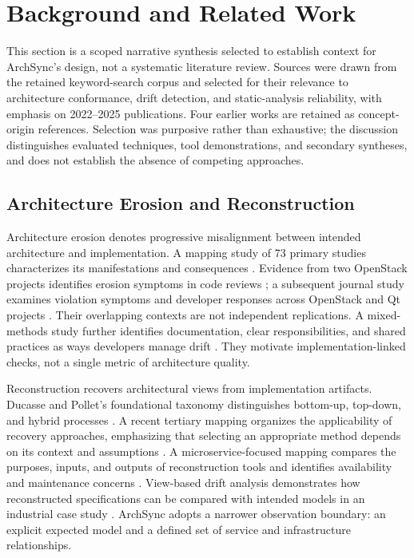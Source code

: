 \section{Background and Related Work}

This section is a scoped narrative synthesis selected to establish context for ArchSync's design, not a systematic literature review. Sources were drawn from the retained keyword-search corpus and selected for their relevance to architecture conformance, drift detection, and static-analysis reliability, with emphasis on 2022--2025 publications. Four earlier works are retained as concept-origin references. Selection was purposive rather than exhaustive; the discussion distinguishes evaluated techniques, tool demonstrations, and secondary syntheses, and does not establish the absence of competing approaches.

\subsection{Architecture Erosion and Reconstruction}

Architecture erosion denotes progressive misalignment between intended architecture and implementation. A mapping study of 73 primary studies characterizes its manifestations and consequences \cite{li2022erosion}. Evidence from two OpenStack projects identifies erosion symptoms in code reviews \cite{li2022symptoms}; a subsequent journal study examines violation symptoms and developer responses across OpenStack and Qt projects \cite{li2023warnings}. Their overlapping contexts are not independent replications. A mixed-methods study further identifies documentation, clear responsibilities, and shared practices as ways developers manage drift \cite{anthony2024drifting}. They motivate implementation-linked checks, not a single metric of architecture quality.

Reconstruction recovers architectural views from implementation artifacts. Ducasse and Pollet's foundational taxonomy distinguishes bottom-up, top-down, and hybrid processes \cite{ducasse2009reconstruction}. A recent tertiary mapping organizes the applicability of recovery approaches, emphasizing that selecting an appropriate method depends on its context and assumptions \cite{sar2024taxonomy}. A microservice-focused mapping compares the purposes, inputs, and outputs of reconstruction tools and identifies availability and maintenance concerns \cite{bakhtin2024mapping}. View-based drift analysis demonstrates how reconstructed specifications can be compared with intended models in an industrial case study \cite{uzun2024drift}. ArchSync adopts a narrower observation boundary: an explicit expected model and a defined set of service and infrastructure relationships.

